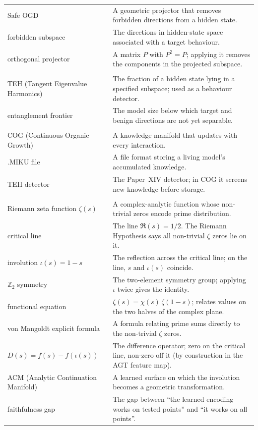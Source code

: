 \documentclass[11pt]{article}
\begin{document}
\begin{longtable}{@{}p{}p{}@{}}
Safe OGD & A geometric projector that removes forbidden directions from a hidden state. \\
forbidden subspace & The directions in hidden-state space associated with a target behaviour. \\
orthogonal projector & A matrix $P$ with $P^2 = P$; applying it removes the components in the projected subspace. \\
\addlinespace
\multicolumn{2}{@{}l}{Paper XIV (Snipe / TEH)} \\
\midrule
TEH (Tangent Eigenvalue Harmonics) & The fraction of a hidden state lying in a specified subspace; used as a behaviour detector. \\
entanglement frontier & The model size below which target and benign directions are not yet separable. \\
\addlinespace
\multicolumn{2}{@{}l}{Paper XV (COG)} \\
\midrule
COG (Continuous Organic Growth) & A knowledge manifold that updates with every interaction. \\
.MIKU file & A file format storing a living model's accumulated knowledge. \\
TEH detector & The Paper~XIV detector; in COG it screens new knowledge before storage. \\
\addlinespace
\multicolumn{2}{@{}l}{Papers XVI--XVIII (Riemann)} \\
\midrule
Riemann zeta function $\zeta(s)$ & A complex-analytic function whose non-trivial zeros encode prime distribution. \\
critical line & The line $\Re(s) = 1/2$. The Riemann Hypothesis says all non-trivial $\zeta$ zeros lie on it. \\
involution $\iota(s) = 1 - s$ & The reflection across the critical line; on the line, $s$ and $\iota(s)$ coincide. \\
$\mathbb{Z}_2$ symmetry & The two-element symmetry group; applying $\iota$ twice gives the identity. \\
functional equation & $\zeta(s) = \chi(s)\,\zeta(1-s)$; relates values on the two halves of the complex plane. \\
von Mangoldt explicit formula & A formula relating prime sums directly to the non-trivial $\zeta$ zeros. \\
$D(s) = f(s) - f(\iota(s))$ & The difference operator; zero on the critical line, non-zero off it (by construction in the AGT feature map). \\
ACM (Analytic Continuation Manifold) & A learned surface on which the involution becomes a geometric transformation. \\
faithfulness gap & The gap between ``the learned encoding works on tested points'' and ``it works on all points''. \\

\end{longtable}
\end{document}
